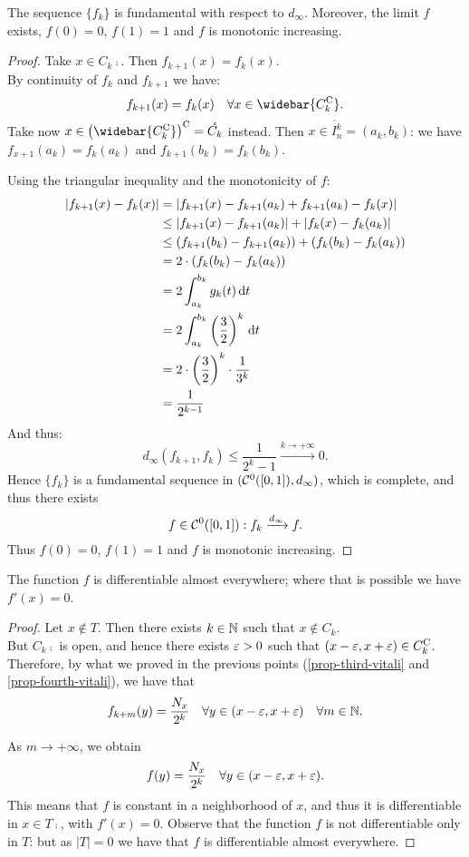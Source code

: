 \begin{prop}\label{prop-fifth-vitali}
	The sequence $\{f_k\}$ is fundamental with respect to $d_\infty$.
	Moreover, the limit $f$ exists, $f(0) = 0$, $f(1) = 1$ and $f$ is monotonic increasing.
\end{prop}
\begin{proof}
	Take $x \in C_k\comp$. Then $f_{k+1}(x) = f_k(x)$.\\
	By continuity of $f_k$ and $f_{k+1}$ we have:
	$$
	f_{k+1}(x) 
	= f_k(x)
	\quad \forall x \in \widebar{C_k\comp}
	.
	$$
	Take now $x \in \left( \widebar{C_k\comp} \right)\comp =  \mathring{C_k}$ instead. Then $x \in \mathring{I_n^k} = (a_k, b_k)$: we have $f_{x+1}(a_k) = f_k(a_k)$ and $f_{k+1}(b_k) = f_k(b_k)$.
	
	Using the triangular inequality and the monotonicity of $f$:
	\begin{align*}
	|f_{k+1}(x) - f_k(x)|
	&= |f_{k+1}(x) - f_{k+1}(a_k) + f_{k+1}(a_k) - f_k(x)| \\
	&\le |f_{k+1}(x) - f_{k+1}(a_k)| + |f_k(x) - f_k(a_k)| \\
	&\le (f_{k+1}(b_k) - f_{k+1}(a_k)) + (f_k(b_k) - f_k(a_k)) \\
	&= 2 \cdot (f_k(b_k) - f_k(a_k))\\
	&= 2 \int_{a_k}^{b_k} g_k(t) \,\mathrm d t\\
	&= 2 \int_{a_k}^{b_k} \left( \frac 3 2 \right)^k \, \mathrm d t\\
	&= 2 \cdot \left( \frac 3 2 \right)^k \cdot \frac{1}{3^k}\\
	&= \frac{1}{2^{k-1}}
	\end{align*}
	And thus:
	\[
	d_\infty(f_{k+1}, f_{k}) 
	\le \frac{1}{2^k-1} 
	\xrightarrow{k \to +\infty} 0
	.
	\]
	Hence $\{ f_k \}$ is a fundamental sequence in $(\mathcal C^0([0, 1]), d_\infty)$, which is complete, and thus there exists
	$$
	f 
	\in \mathcal C^0([0, 1]):
	f_k 
	\xrightarrow{d_\infty} f
	.
	$$
	Thus $f(0) = 0$, $f(1) = 1$ and $f$ is monotonic increasing.
\end{proof}

\begin{prop}\label{prop-sixth-vitali}
	The function $f$ is differentiable almost everywhere; where that is possible we have $f'(x) = 0$.
\end{prop}
\begin{proof}
	Let $x \notin T$. Then there exists $k \in \mathbb N$ such that $x \notin C_k$.\\
	But $C_k\comp$ is open, and hence there exists $\varepsilon > 0$ such that $(x - \varepsilon, x + \varepsilon) \in C_k^{\mathrm{C}}$. Therefore, by what we proved in the previous points (\vref{prop-third-vitali} and \vref{prop-fourth-vitali}), we have that 
	$$
	f_{k+m}(y) 
	= \frac{N_x}{2^k}
	\quad \forall y \in (x - \varepsilon, x + \varepsilon) 
	\quad \forall m \in \mathbb N
	.
	$$
	
	As $m \to + \infty$, we obtain 
	$$
	f(y) 
	= \frac{N_x}{2^k} 
	\quad \forall y \in (x - \varepsilon, x + \varepsilon)
	.
	$$
	This means that $f$ is constant in a neighborhood of $x$, and thus it is differentiable in $x \in T\comp$, with $f'(x) = 0$. Observe that the function $f$ is not differentiable only in $T$: but as $|T| = 0$ we have that $f$ is differentiable almost everywhere.
\end{proof}